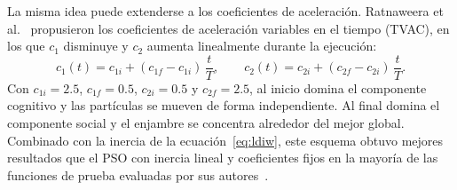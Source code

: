 La misma idea puede extenderse a los coeficientes de aceleración. Ratnaweera et al.~\cite{ratnaweera2004self} propusieron los coeficientes de aceleración variables en el tiempo (TVAC), en los que $c_1$ disminuye y $c_2$ aumenta linealmente durante la ejecución:
\begin{equation}
    c_1(t) = c_{1i} + (c_{1f} - c_{1i})\,\frac{t}{T}, \qquad
    c_2(t) = c_{2i} + (c_{2f} - c_{2i})\,\frac{t}{T}.
    \label{eq:tvac}
\end{equation}
Con $c_{1i} = 2.5$, $c_{1f} = 0.5$, $c_{2i} = 0.5$ y $c_{2f} = 2.5$, al inicio domina el componente cognitivo y las partículas se mueven de forma independiente. Al final domina el componente social y el enjambre se concentra alrededor del mejor global. Combinado con la inercia de la ecuación~\eqref{eq:ldiw}, este esquema obtuvo mejores resultados que el PSO con inercia lineal y coeficientes fijos en la mayoría de las funciones de prueba evaluadas por sus autores~\cite{ratnaweera2004self}.
